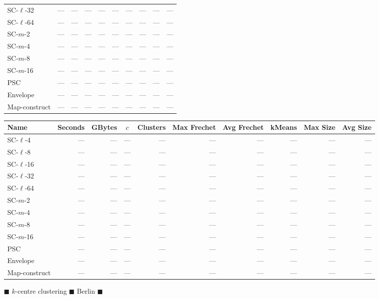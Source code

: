 \begin{figure}
\begin{center}
\begin{minipage}{\textwidth}
{\begin{tabular}{@{}lrrcrrrrrr@{}}
        SC-$\ell$-32 & --- & --- & --- & --- & --- & --- & --- & --- & ---\\
        SC-$\ell$-64 & --- & --- & --- & --- & --- & --- & --- & --- & ---\\
        SC-$m$-2 & --- & --- & --- & --- & --- & --- & --- & --- & ---\\
        SC-$m$-4 & --- & --- & --- & --- & --- & --- & --- & --- & ---\\
        SC-$m$-8 & --- & --- & --- & --- & --- & --- & --- & --- & ---\\
        SC-$m$-16 & --- & --- & --- & --- & --- & --- & --- & --- & ---\\
        PSC & --- & --- & --- & --- & --- & --- & --- & --- & ---\\
        Envelope & --- & --- & --- & --- & --- & --- & --- & --- & ---\\
        Map-construct & --- & --- & --- & --- & --- & --- & --- & --- & ---\\
        \bottomrule
    \end{tabular}
    }
    {
    \begin{tabular}{@{}lrrcrrrrrr@{}}
        \toprule
        Name & Seconds & GBytes & $c$ & Clusters & Max Frechet & Avg Frechet & kMeans & Max Size & Avg Size\\
        \midrule
        SC-$\ell$-4 & --- & --- & --- & --- & --- & --- & --- & --- & ---\\
        SC-$\ell$-8 & --- & --- & --- & --- & --- & --- & --- & --- & ---\\
        SC-$\ell$-16 & --- & --- & --- & --- & --- & --- & --- & --- & ---\\
        SC-$\ell$-32 & --- & --- & --- & --- & --- & --- & --- & --- & ---\\
        SC-$\ell$-64 & --- & --- & --- & --- & --- & --- & --- & --- & ---\\
        SC-$m$-2 & --- & --- & --- & --- & --- & --- & --- & --- & ---\\
        SC-$m$-4 & --- & --- & --- & --- & --- & --- & --- & --- & ---\\
        SC-$m$-8 & --- & --- & --- & --- & --- & --- & --- & --- & ---\\
        SC-$m$-16 &--- & --- & --- & --- & --- & --- & --- & --- & ---\\
        PSC & --- & --- & --- & --- & --- & --- & --- & --- & ---\\
        Envelope & --- & --- & --- & --- & --- & --- & --- & --- & ---\\
        Map-construct & --- & --- & --- & --- & --- & --- & --- & --- & ---\\
        \bottomrule
    \end{tabular}
    }
    \end{minipage}

        \caption{$\blacksquare$ $k$-centre clustering $\blacksquare$ Berlin   $\blacksquare$}
    \end{center} \end{figure}